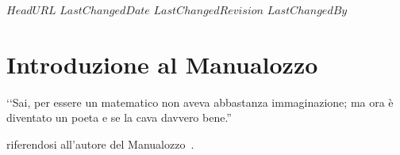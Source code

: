 \svnidlong
{$HeadURL$}
{$LastChangedDate$}
{$LastChangedRevision$}
{$LastChangedBy$}

\chapter*{Introduzione al Manualozzo\texttrademark\ }
\thispagestyle{empty}

\begin{introduction}
‘‘Sai, per essere un matematico non aveva abbastanza immaginazione; ma ora è diventato un poeta e se la cava davvero bene.''
\begin{flushright}
	 riferendosi  all'autore del Manualozzo\texttrademark\ .
\end{flushright}
\end{introduction}

